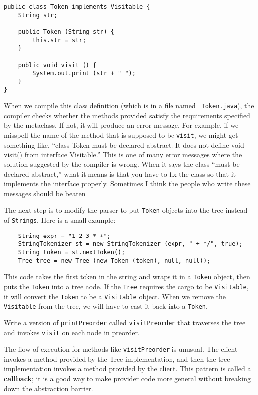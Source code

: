 \begin{verbatim}
public class Token implements Visitable {
    String str;

    public Token (String str) {
        this.str = str;
    }

    public void visit () {
        System.out.print (str + " ");
    }
}
\end{verbatim}
%
When we compile this class definition (which is in a file named {\tt
Token.java}), the compiler checks whether the methods provided satisfy
the requirements specified by the metaclass.  If not, it will
produce an error message.  For example, if we misspell the name of the
method that is supposed to be {\tt visit}, we might get
something like, ``class Token must be declared abstract. It does not
define void visit() from interface Visitable.''  This is one of
many error messages where the solution suggested by the compiler
is wrong.  When it says the class ``must be declared abstract,''
what it means is that you have to fix the class so that it implements
the interface properly.  Sometimes I think the people who write
these messages should be beaten.

The next step is to modify the parser to put {\tt Token} objects
into the tree instead of {\tt Strings}.  Here is a small example:

\begin{verbatim}
    String expr = "1 2 3 * +";
    StringTokenizer st = new StringTokenizer (expr, " +-*/", true);
    String token = st.nextToken();
    Tree tree = new Tree (new Token (token), null, null));
\end{verbatim}
%
This code takes the first token in the string and wraps it in
a {\tt Token} object, then puts the {\tt Token} into a tree node.
If the {\tt Tree} requires the cargo to be {\tt Visitable}, it
will convert the {\tt Token} to be a {\tt Visitable} object.
When we remove the {\tt Visitable} from the tree, we will have
to cast it back into a {\tt Token}.

\begin{exercise}
Write a version of {\tt printPreorder} called
{\tt visitPreorder} that traverses the tree and invokes
{\tt visit} on each node in preorder.
\end{exercise}

The flow of execution for methods like {\tt visitPreorder} is
unusual.  The client invokes a method provided by the Tree
implementation, and then the tree implementation invokes a
method provided by the client.  This pattern is called a
{\bf callback}; it is a good way to make provider code more
general without breaking down the abstraction barrier.

